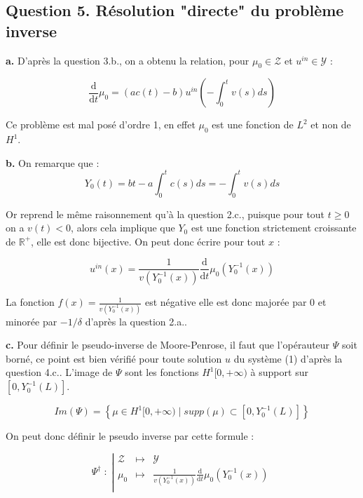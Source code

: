 \documentclass[a4paper]{article}
\newcommand{\Y}{\mathscr{Y}}
\newcommand{\Z}{\mathscr{Z}}
\begin{document}
\subsection*{Question 5. Résolution "directe" du problème inverse}

\textbf{a.}
D'après la question 3.b., on a obtenu la relation, pour $\mu_0 \in \mathscr{Z}$ 
et $u^{in} \in \mathscr{Y}$ :

\[ \displaystyle \frac{\mathrm{d}}{\mathrm{d} t} \mu_0 
= (ac(t)-b)u^{in}(-\int_0^tv(s)ds)\]

Ce problème est mal posé d'ordre 1, en effet $\mu_0$ est une fonction de $L^2$ et non de $H^1$. 

\textbf{b.}
On remarque que :
\[ Y_0(t) = bt - a\int_0^t c(s)ds = -\int_0^t v(s)ds\]

Or reprend le même raisonnement qu'à la question 2.c., puisque pour tout $t \geq 0 $ on a $v(t)<0$,
alors cela implique que $Y_0$ est une fonction strictement croissante de $\mathbb{R}^+$, elle est donc bijective.
On peut donc écrire pour tout $x $ :

\[ u^{in}(x) = \displaystyle \frac{1}{v(Y_0^{-1}(x))} \frac{\mathrm{d}}{\mathrm{d} t} \mu_0 (Y_0^{-1}(x))\]

La fonction $f(x) = \frac{1}{v(Y_0^{-1}(x))} $ est négative elle est donc majorée par $0$ et minorée par $-1/\delta$ d'après la question 2.a..

\textbf{c.}
Pour définir le pseudo-inverse de Moore-Penrose, il faut que l'opérauteur $\Psi$ soit borné, ce point est bien vérifié pour toute solution $u$ du système (1) d'après la question 4.c..
L'image de $\Psi$ sont les fonctions $H^1[0,+\infty)$ à support sur $[0,Y_0^{-1}(L)]$.

\[ Im(\Psi) = \left\{\mu \in H^1[0,+\infty) \;|\; supp(\mu) \subset[0,Y_0^{-1}(L)] \right\} \]

On peut donc définir le pseudo inverse par cette formule :

\begin{equation}
	 \Psi^\dagger \; : \; \left\vert
	\begin{array}{ccc}
	\Z & \mapsto & \Y \\
	\mu_0 & \mapsto & \displaystyle \frac{1}{v(Y_0^{-1}(x))} \frac{\mathrm{d}}{\mathrm{d} t} \mu_0 (Y_0^{-1}(x)) \\
	\end{array} \right.
\end{equation}
\end{document}
